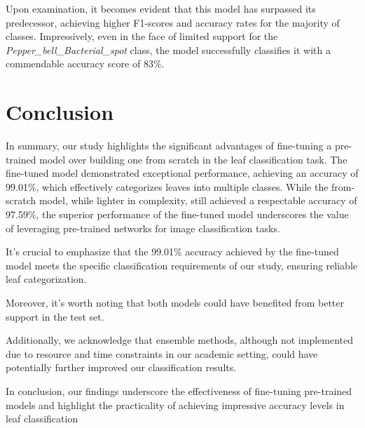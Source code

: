 Upon examination, it becomes evident that this model has surpassed its predecessor, achieving higher F1-scores and 
accuracy rates for the majority of classes. Impressively, even in the face of limited support for the 
\textit{Pepper\_bell\_Bacterial\_spot} class, the model successfully classifies it with a commendable accuracy score of 83\%.

\section{Conclusion}

In summary, our study highlights the significant advantages of fine-tuning a pre-trained model over building one from 
scratch in the leaf classification task. The fine-tuned model demonstrated exceptional performance, achieving an accuracy
of 99.01\%, which effectively categorizes leaves into multiple classes. While the from-scratch model, while lighter 
in complexity, still achieved a respectable accuracy of 97.59\%, the superior performance of the fine-tuned model 
underscores the value of leveraging pre-trained networks for image classification tasks.

It's crucial to emphasize that the 99.01\% accuracy achieved by the fine-tuned model meets the specific classification 
requirements of our study, ensuring reliable leaf categorization.

Moreover, it's worth noting that both models could have benefited from better support in the test set.

Additionally, we acknowledge that ensemble methods, although not implemented due to resource and time constraints 
in our academic setting, could have potentially further improved our classification results.

In conclusion, our findings underscore the effectiveness of fine-tuning pre-trained models and highlight the practicality 
of achieving impressive accuracy levels in leaf classification